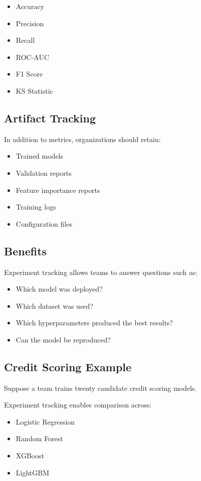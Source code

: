 \begin{itemize}
    \item Accuracy
    \item Precision
    \item Recall
    \item ROC-AUC
    \item F1 Score
    \item KS Statistic
\end{itemize}

\subsection{Artifact Tracking}

In addition to metrics, organizations should retain:

\begin{itemize}
    \item Trained models
    \item Validation reports
    \item Feature importance reports
    \item Training logs
    \item Configuration files
\end{itemize}

\subsection{Benefits}

Experiment tracking allows teams to answer questions such as:

\begin{itemize}
    \item Which model was deployed?
    \item Which dataset was used?
    \item Which hyperparameters produced the best results?
    \item Can the model be reproduced?
\end{itemize}

\subsection{Credit Scoring Example}

Suppose a team trains twenty candidate credit scoring models.

Experiment tracking enables comparison across:

\begin{itemize}
    \item Logistic Regression
    \item Random Forest
    \item XGBoost
    \item LightGBM
\end{itemize}

